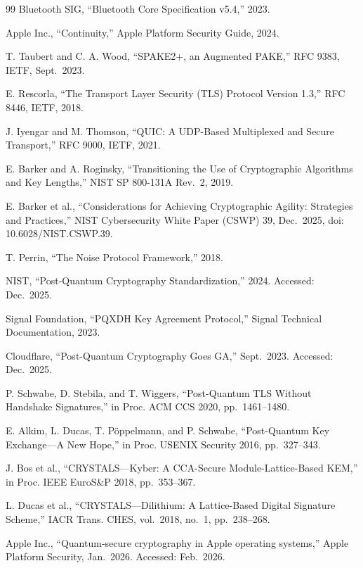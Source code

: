 \documentclass[10pt,journal,compsoc]{IEEEtran}
\begin{document}
\begin{thebibliography}{99}
 Bluetooth SIG, ``Bluetooth Core Specification v5.4,'' 2023.

 Apple Inc., ``Continuity,'' Apple Platform Security Guide, 2024.

 T. Taubert and C. A. Wood, ``SPAKE2+, an Augmented PAKE,'' RFC 9383, IETF, Sept.~2023.

 E. Rescorla, ``The Transport Layer Security (TLS) Protocol Version 1.3,'' RFC 8446, IETF, 2018.

 J. Iyengar and M. Thomson, ``QUIC: A UDP-Based Multiplexed and Secure Transport,'' RFC 9000, IETF, 2021.

 E. Barker and A. Roginsky, ``Transitioning the Use of Cryptographic Algorithms and Key Lengths,'' NIST SP 800-131A Rev.~2, 2019.

 E. Barker et al., ``Considerations for Achieving Cryptographic Agility: Strategies and Practices,'' NIST Cybersecurity White Paper (CSWP) 39, Dec.~2025, doi: 10.6028/NIST.CSWP.39.

 T. Perrin, ``The Noise Protocol Framework,'' 2018.

 NIST, ``Post-Quantum Cryptography Standardization,'' 2024. Accessed: Dec.~2025.

 Signal Foundation, ``PQXDH Key Agreement Protocol,'' Signal Technical Documentation, 2023.

 Cloudflare, ``Post-Quantum Cryptography Goes GA,'' Sept.~2023. Accessed: Dec.~2025.

 P. Schwabe, D. Stebila, and T. Wiggers, ``Post-Quantum TLS Without Handshake Signatures,'' in Proc. ACM CCS 2020, pp.~1461--1480.

 E. Alkim, L. Ducas, T. P\"{o}ppelmann, and P. Schwabe, ``Post-Quantum Key Exchange---A New Hope,'' in Proc. USENIX Security 2016, pp.~327--343.

 J. Bos et al., ``CRYSTALS---Kyber: A CCA-Secure Module-Lattice-Based KEM,'' in Proc. IEEE EuroS\&P 2018, pp.~353--367.

 L. Ducas et al., ``CRYSTALS---Dilithium: A Lattice-Based Digital Signature Scheme,'' IACR Trans. CHES, vol.~2018, no.~1, pp.~238--268.

 Apple Inc., ``Quantum-secure cryptography in Apple operating systems,'' Apple Platform Security, Jan.~2026. Accessed: Feb.~2026.


\end{thebibliography}
\end{document}
